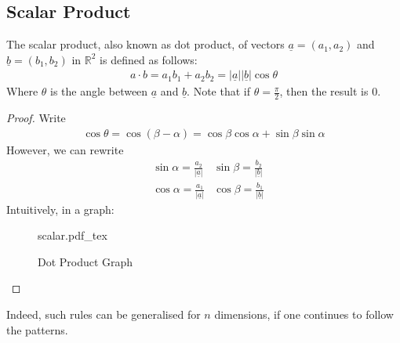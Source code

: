\documentclass[a4paper]{article}
\newcommand{\incfig}[2][1]{%
    \def\svgwidth{#1\columnwidth}
    {#2.pdf_tex}
}
\theoremstyle{plain}
\theoremstyle{definition}
\newtheorem{defn}{Definition}[section]
\theoremstyle{remark}
\begin{document}
\subsection{Scalar Product}
\begin{tcolorbox}[colback=black!3!white,colframe=black!60!white,title=\begin{defn}Scalar Product \label{Scalar Product}\end{defn}]
The scalar product, also known as dot product, of vectors $\underline{a}=(a_1,a_2)$ and $\underline{b}=(b_1,b_2)$ in $\mathbb{R}^2$ is defined as follows:
\begin{align*}
	a \cdot b = a_1b_1+a_2b_2 = |\underline{a}| |\underline{b}| \cos \theta
\end{align*}
Where $\theta$ is the angle between $\underline{a}$ and $\underline{b}$. Note that if $\theta = \frac{\pi}{2}$, then the result is $0$.
\begin{proof}
	Write
	\begin{align*}
		\cos \theta = \cos \left( \beta - \alpha \right)  = \cos \beta \cos \alpha + \sin \beta \sin \alpha
	\end{align*}
	However, we can rewrite
	\begin{align*}
		&\sin \alpha = \frac{a_2}{|\underline{a}|} &\sin \beta = \frac{b_2}{|\underline{b}|} \\
		&\cos \alpha = \frac{a_1}{|\underline{a}|} &\cos \beta = \frac{b_1}{ | \underline{b} |}
	\end{align*}
Intuitively, in a graph:
\begin{figure}[H]
    \centering
    \incfig{scalar}
    \caption{Dot Product Graph}
    \label{fig:scalar}
\end{figure}
\end{proof}
\end{tcolorbox}
Indeed, such rules can be generalised for $n$ dimensions, if one continues to follow the patterns.
\end{document}
